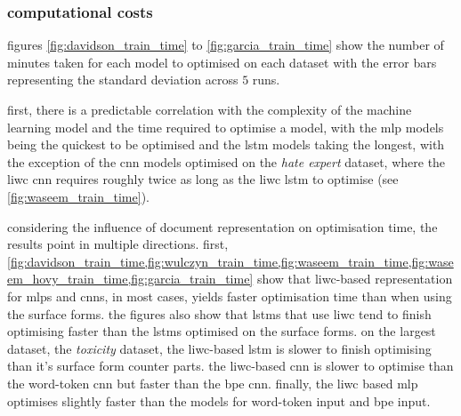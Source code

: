 \subsubsection{computational costs}

figures \ref{fig:davidson_train_time} to \ref{fig:garcia_train_time} show the number of minutes taken for each model to optimised on each dataset with the error bars representing the standard deviation across $5$ runs.

first, there is a predictable correlation with the complexity of the machine learning model and the time required to optimise a model, with the mlp models being the quickest to be optimised and the lstm models taking the longest, with the exception of the cnn models optimised on the \textit{hate expert} dataset, where the liwc cnn requires roughly twice as long as the liwc lstm to optimise (see \cref{fig:waseem_train_time}).

considering the influence of document representation on optimisation time, the results point in multiple directions.
first, \cref{fig:davidson_train_time,fig:wulczyn_train_time,fig:waseem_train_time,fig:waseem_hovy_train_time,fig:garcia_train_time} show that liwc-based representation for mlps and cnns, in most cases, yields faster optimisation time than when using the surface forms.
the figures also show that lstms that use liwc tend to finish optimising faster than the lstms optimised on the surface forms.
on the largest dataset, the \textit{toxicity} dataset, the liwc-based lstm is slower to finish optimising than it's surface form counter parts.
the liwc-based cnn is slower to optimise than the word-token cnn but faster than the bpe cnn.
finally, the liwc based mlp optimises slightly faster than the models for word-token input and bpe input.

